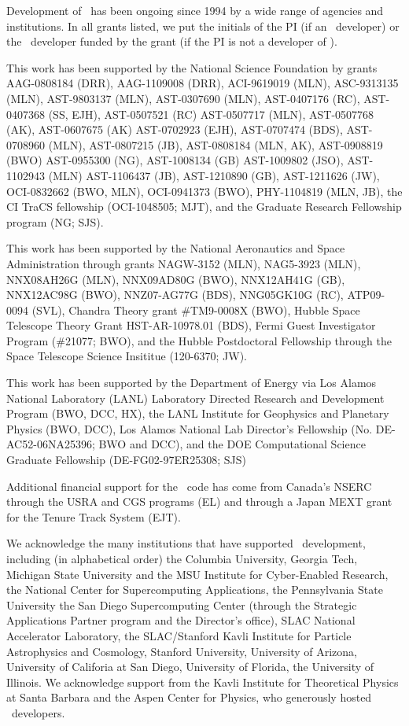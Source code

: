 
\acknowledgments

Development of \enzo\ has been ongoing since 1994 by a wide range of
agencies and institutions.  In all grants listed, we put the
initials of the PI (if an \enzo\ developer) or the \enzo\ developer
funded by the grant (if the PI is not a developer of \enzo).

This work has been supported by the National Science Foundation by
grants
AAG-0808184 (DRR),
AAG-1109008 (DRR),
ACI-9619019 (MLN),
ASC-9313135 (MLN),
AST-9803137 (MLN), 
AST-0307690 (MLN), 
AST-0407176 (RC),
AST-0407368 (SS, EJH),
AST-0507521 (RC) 
AST-0507717 (MLN), 
AST-0507768 (AK),
AST-0607675 (AK)
AST-0702923 (EJH),
AST-0707474 (BDS), 
AST-0708960 (MLN), 
AST-0807215 (JB),
AST-0808184 (MLN, AK),
AST-0908819 (BWO) 
AST-0955300 (NG),
AST-1008134 (GB) 
AST-1009802 (JSO), 
AST-1102943 (MLN)
AST-1106437 (JB),
AST-1210890 (GB),
AST-1211626 (JW),
OCI-0832662 (BWO, MLN),
OCI-0941373 (BWO),
PHY-1104819 (MLN, JB),
the CI TraCS fellowship (OCI-1048505; MJT),
and the Graduate Research Fellowship program (NG; SJS).

This work has been supported by the National Aeronautics and Space
Administration through grants
NAGW-3152 (MLN),
NAG5-3923 (MLN),
NNX08AH26G (MLN),
NNX09AD80G (BWO),
NNX12AH41G (GB),
NNX12AC98G (BWO),
NNZ07-AG77G (BDS),
NNG05GK10G (RC),
ATP09-0094 (SVL),
Chandra Theory grant \#TM9-0008X (BWO),
Hubble Space Telescope Theory Grant HST-AR-10978.01 (BDS),
Fermi Guest Investigator Program (\#21077; BWO),
and the Hubble Postdoctoral Fellowship through the Space Telescope Science
Insititue (120-6370; JW).

This work has been supported by the Department of Energy via
Los Alamos National Laboratory (LANL) Laboratory Directed Research and
Development Program (BWO, DCC, HX), 
the LANL Institute for Geophysics and Planetary Physics (BWO, DCC),
Los Alamos National Lab Director's Fellowship (No. DE-AC52-06NA25396;
BWO and DCC), and the
DOE Computational Science Graduate Fellowship (DE-FG02-97ER25308; SJS)

Additional financial support for the \enzo\ code has come from
Canada's NSERC through the USRA and CGS programs (EL) and through a 
Japan MEXT grant for the Tenure Track System (EJT).

We acknowledge the  many institutions that have supported \enzo\
development, including (in alphabetical order)
the
Columbia University,
Georgia Tech,
Michigan State University and the MSU Institute for Cyber-Enabled
Research, 
the National Center for Supercomputing Applications, 
the Pennsylvania State University
 the San Diego Supercomputing Center (through the Strategic Applications
Partner program and the Director’s office),
SLAC National Accelerator Laboratory,
the SLAC/Stanford Kavli Institute for Particle
Astrophysics and Cosmology,  Stanford University,
University of Arizona,
University of Califoria at San Diego, 
 University of Florida,
the University of Illinois.
We acknowledge support from the Kavli Institute for Theoretical
Physics at Santa Barbara and the Aspen Center for Physics, who
generously hosted \enzo\ developers.

